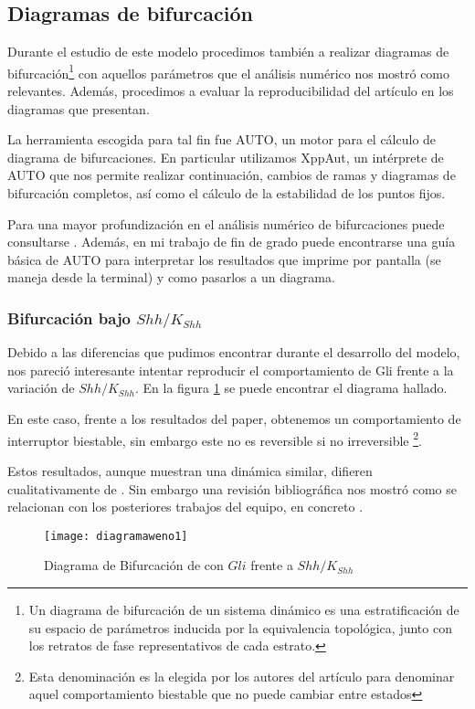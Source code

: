 \subsection{Diagramas de bifurcación}
Durante el estudio de este modelo procedimos también a realizar diagramas de bifurcación\footnote{Un diagrama de bifurcación de un sistema dinámico es una estratificación de su espacio de parámetros inducida por la equivalencia topológica, junto con los retratos de fase representativos de cada estrato.} con aquellos parámetros que el análisis numérico nos mostró como relevantes. Además, procedimos a evaluar la reproducibilidad del artículo en los diagramas que presentan. 

La herramienta escogida para tal fin  fue AUTO, un motor para el cálculo de diagrama de bifurcaciones. En particular utilizamos XppAut, un intérprete de AUTO que nos permite realizar continuación, cambios de ramas y diagramas de bifurcación completos, así como el cálculo de la estabilidad de los puntos fijos. 

Para una mayor profundización en el análisis numérico de bifurcaciones puede consultarse \cite{meijer2012numerical}. Además, en mi trabajo de fin de grado \cite{Yo} puede encontrarse una guía básica de AUTO para interpretar los resultados que imprime por pantalla (se maneja desde la terminal) y como pasarlos a un diagrama. 


\subsubsection{Bifurcación bajo $Shh/K_{Shh}$}
Debido a las diferencias que pudimos encontrar durante el desarrollo del modelo, nos pareció interesante intentar reproducir el comportamiento de Gli frente a la variación de $Shh/K_{Shh}$.  En la figura \ref{lai_12} se puede encontrar el diagrama hallado.

En este caso, frente a los resultados del paper, obtenemos un comportamiento de interruptor biestable, sin embargo este no es reversible si no irreversible \footnote{Esta denominación es la elegida por los autores del artículo para denominar aquel comportamiento biestable que no puede cambiar entre estados}. 

Estos resultados, aunque muestran una dinámica similar, difieren cualitativamente de \cite{schaffer}. Sin embargo una revisión bibliográfica nos mostró como se relacionan con los posteriores trabajos del equipo, en concreto \cite{saha}.
\begin{figure}[h]
	\texttt{[image: diagramaweno1]}
	\centering
	\caption{Diagrama de Bifurcación de \cite{schaffer} con $Gli$ frente a $Shh/K_{Shh}$}
	\label{lai_12}
\end{figure}



